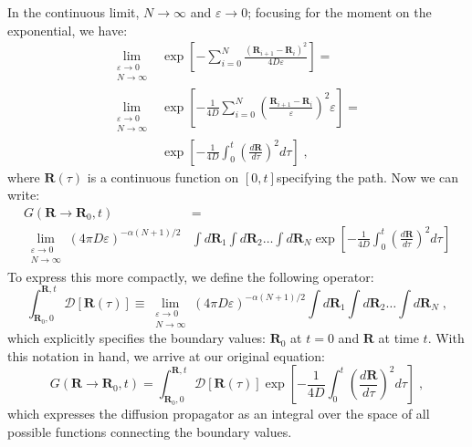 \documentclass[letterpaper,12pt]{article}
\renewcommand{\vec}[1]{\mathbf{#1}}
\begin{document}
In the continuous limit, $N \to \infty$ and $\varepsilon \to 0$; focusing for the moment on the exponential, we have:
\begin{equation}
\begin{aligned}
\lim_{\substack{\varepsilon \to 0 \\ N \to \infty}} &\exp\left[ - \sum_{i=0}^{N} \frac{(\vec{R}_{i+1} - \vec{R}_i)^2}{4D\varepsilon}\right] =\\ 
\lim_{\substack{\varepsilon \to 0 \\ N \to \infty}}  &\exp\left[ - \frac{1}{4D}\sum_{i=0}^{N} {\left( \frac{\vec{R}_{i+1} - \vec{R}_i}{\varepsilon} \right)}^{2} \varepsilon \right] =\\
&\exp\left[ - \frac{1}{4D} \int_{0}^{t} \left(\frac{d\vec{R}}{d\tau}\right)^{2} d\tau\right] \; ,
\end{aligned}
\end{equation}
where $\vec{R}(\tau)$ is a continuous function on $[0,t]$specifying the path. Now we can write:
\begin{equation}
\begin{aligned}
G(\vec{R} \rightarrow \vec{R}_{0} , t) &=\\
\lim_{\substack{\varepsilon \to 0 \\ N \to \infty}} (4\pi D \varepsilon)^{-\alpha(N+1)/2} &\int d\vec{R}_1 \int d\vec{R}_2 \ldots \int d\vec{R}_N  \exp\left[ - \frac{1}{4D} \int_{0}^{t} \left(\frac{d\vec{R}}{d\tau}\right)^{2} d\tau\right]
\end{aligned}
\end{equation}
To express this more compactly, we define the following operator:
\begin{equation}
\int_{\vec{R}_{0},0}^{\vec{R},t} \mathscr{D}[\vec{R}(\tau)] \equiv \lim_{\substack{\varepsilon \to 0 \\ N \to \infty}} (4\pi D \varepsilon)^{-\alpha(N+1)/2} \int d\vec{R}_1 \int d\vec{R}_2 \ldots \int d\vec{R}_N \; ,
\end{equation}
which explicitly specifies the boundary values: $\vec{R}_{0}$ at $t=0$ and $\vec{R}$ at time $t$. With this notation in hand, we arrive at our original equation:
\begin{equation} \label{eqn:gFinal}
G(\vec{R} \rightarrow \vec{R}_{0} , t) = \int_{\vec{R}_{0},0}^{\vec{R},t} \mathscr{D} [\vec{R}(\tau)]\exp\left[ -\frac{1}{4D} \int_{0}^{t} {\left(\frac{d\vec{R}}{d\tau} \right)}^{2} d\tau\right] \;,
\end{equation}
which expresses the diffusion propagator as an integral over the space of all possible functions connecting the boundary values.
\end{document}
